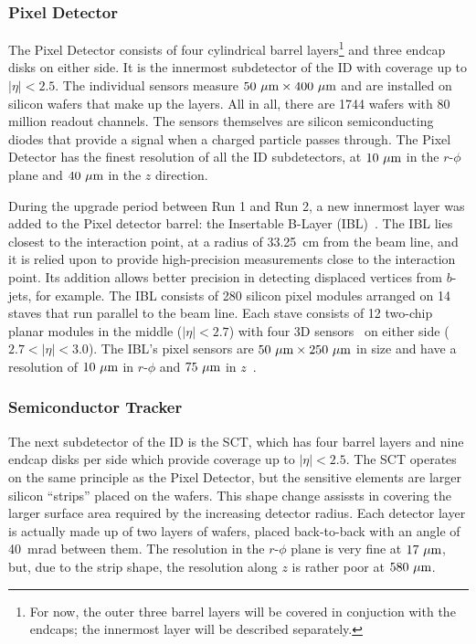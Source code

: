 \subsubsection{Pixel Detector} \label{sec:pixel}
The Pixel Detector consists of four cylindrical barrel layers\footnote{For now, the outer three barrel layers will be covered in conjuction with the endcaps; the innermost layer will be described separately.} and three endcap disks on either side.
It is the innermost subdetector of the ID with coverage up to $|\eta| < 2.5$.
The individual sensors measure $50~\mu\textrm{m}\times 400~\mu\textrm{m}$ and are installed on silicon wafers that make up the layers.
All in all, there are 1744 wafers with 80 million readout channels.
The sensors themselves are silicon semiconducting diodes that provide a signal when a charged particle passes through.
The Pixel Detector has the finest resolution of all the ID subdetectors, at $10~\mu\textrm{m}$ in the $r$-$\phi$ plane and $40~\mu\textrm{m}$ in the $z$ direction.

During the upgrade period between Run 1 and Run 2, a new innermost layer was added to the Pixel detector barrel: the Insertable B-Layer (IBL)~\cite{2010.ibl-tdr}.
The IBL lies closest to the interaction point, at a radius of 33.25~cm from the beam line, and it is relied upon to provide high-precision measurements close to the interaction point.
Its addition allows better precision in detecting displaced vertices from $b$-jets, for example.
The IBL consists of 280 silicon pixel modules arranged on 14 staves that run parallel to the beam line.
Each stave consists of 12 two-chip planar modules in the middle ($|\eta| < 2.7$) with four 3D sensors~\cite{2015.ibl-3d} on either side ($2.7 < |\eta| < 3.0$).
The IBL's pixel sensors are $50~\mu\textrm{m}\times 250~\mu\textrm{m}$ in size and have a resolution of $10~\mu\textrm{m}$ in $r$-$\phi$ and $75~\mu\textrm{m}$ in $z$~\cite{2016.ibl-resolution}.

\subsubsection{Semiconductor Tracker} \label{sec:sct}
The next subdetector of the ID is the SCT, which has four barrel layers and nine endcap disks per side which provide coverage up to $|\eta| < 2.5$.
The SCT operates on the same principle as the Pixel Detector, but the sensitive elements are larger silicon ``strips'' placed on the wafers.
This shape change assissts in covering the larger surface area required by the increasing detector radius.
Each detector layer is actually made up of two layers of wafers, placed back-to-back with an angle of 40~mrad between them.
The resolution in the $r$-$\phi$ plane is very fine at $17~\mu\textrm{m}$, but, due to the strip shape, the resolution along $z$ is rather poor at $580~\mu\textrm{m}$.

